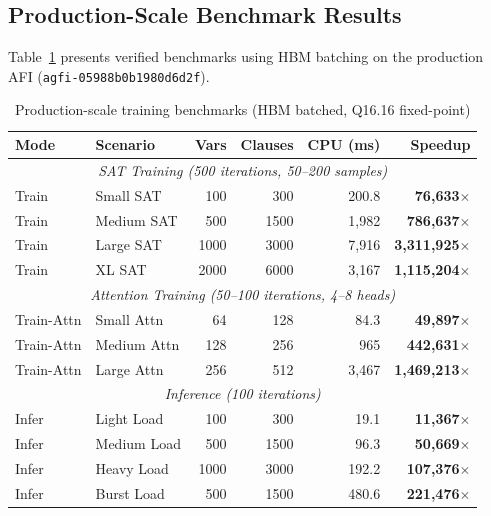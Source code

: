 \documentclass[11pt,a4paper]{article}
\begin{document}
\subsection{Production-Scale Benchmark Results}
\label{subsec:production_results_chirho}

Table~\ref{tab:production_chirho} presents verified benchmarks using HBM batching
on the production AFI (\texttt{agfi-05988b0b1980d6d2f}).

\begin{table}[ht]
\centering
\caption{Production-scale training benchmarks (HBM batched, Q16.16 fixed-point)}
\label{tab:production_chirho}
\begin{tabular}{llrrrr}
\toprule
\textbf{Mode} & \textbf{Scenario} & \textbf{Vars} & \textbf{Clauses} & \textbf{CPU (ms)} & \textbf{Speedup} \\
\midrule
\multicolumn{6}{c}{\textit{SAT Training (500 iterations, 50--200 samples)}} \\
Train & Small SAT & 100 & 300 & 200.8 & \textbf{76,633$\times$} \\
Train & Medium SAT & 500 & 1500 & 1,982 & \textbf{786,637$\times$} \\
Train & Large SAT & 1000 & 3000 & 7,916 & \textbf{3,311,925$\times$} \\
Train & XL SAT & 2000 & 6000 & 3,167 & \textbf{1,115,204$\times$} \\
\midrule
\multicolumn{6}{c}{\textit{Attention Training (50--100 iterations, 4--8 heads)}} \\
Train-Attn & Small Attn & 64 & 128 & 84.3 & \textbf{49,897$\times$} \\
Train-Attn & Medium Attn & 128 & 256 & 965 & \textbf{442,631$\times$} \\
Train-Attn & Large Attn & 256 & 512 & 3,467 & \textbf{1,469,213$\times$} \\
\midrule
\multicolumn{6}{c}{\textit{Inference (100 iterations)}} \\
Infer & Light Load & 100 & 300 & 19.1 & \textbf{11,367$\times$} \\
Infer & Medium Load & 500 & 1500 & 96.3 & \textbf{50,669$\times$} \\
Infer & Heavy Load & 1000 & 3000 & 192.2 & \textbf{107,376$\times$} \\
Infer & Burst Load & 500 & 1500 & 480.6 & \textbf{221,476$\times$} \\
\bottomrule
\end{tabular}
\end{table}
\end{document}
